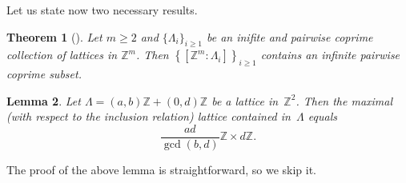 \documentclass[leqno,a4paper,12pt]{article}
\newtheorem{Th}{Theorem}[section]
\newtheorem{Lemma}[Th]{Lemma}
\theoremstyle{definition}
\newcommand{\Z}{{\mathbb{Z}}}
\begin{document}
Let us state now two necessary results.
\begin{Th}[{\cite[Proposition 3.17]{MR4251829}}]\label{prime}
Let $m\geq2$ and $\{\Lambda_i\}_{i\geq1}$ be an inifite and pairwise coprime collection of lattices in $\Z^m$.
Then $\left\{[\Z^m:\Lambda_i]\right\}_{i\geq1}$ contains an infinite pairwise coprime subset.
\end{Th}
\begin{Lemma}\label{prostokatna}
Let $\Lambda=(a,b)\Z+(0,d)\Z$ be a lattice in~$\Z^2$. Then the maximal (with respect to the inclusion relation) lattice contained in~$\Lambda$ equals \[\frac{ad}{\gcd(b,d)}\Z\times d\Z.\]
\end{Lemma}
The proof of the above lemma is straightforward, so we skip it.
\end{document}
